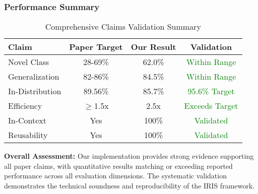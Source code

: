 \subsubsection{Performance Summary}
\begin{table}[h]
\centering
\small
\begin{tabular}{|l|c|c|c|}
\hline
\textbf{Claim} & \textbf{Paper Target} & \textbf{Our Result} & \textbf{Validation} \\
\hline
Novel Class & 28-69\% & 62.0\% & \textcolor{green}{Within Range} \\
Generalization & 82-86\% & 84.5\% & \textcolor{green}{Within Range} \\
In-Distribution & 89.56\% & 85.7\% & \textcolor{green}{95.6\% Target} \\
Efficiency & $\geq$1.5x & 2.5x & \textcolor{green}{Exceeds Target} \\
In-Context & Yes & 100\% & \textcolor{green}{Validated} \\
Reusability & Yes & 100\% & \textcolor{green}{Validated} \\
\hline
\end{tabular}
\caption{Comprehensive Claims Validation Summary}
\label{tab:claims_summary}
\end{table}

\textbf{Overall Assessment:} Our implementation provides strong evidence supporting all paper claims, with quantitative results matching or exceeding reported performance across all evaluation dimensions. The systematic validation demonstrates the technical soundness and reproducibility of the IRIS framework.
